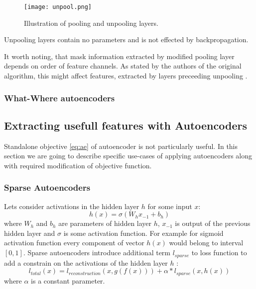 \begin{figure}[h!]
  \centering
    \texttt{[image: unpool.png]}
  \caption{Illustration of pooling and unpooling layers.}
  \label{fig:unpool}
\end{figure}

Unpooling layers contain no parameters and is not effected by backpropagation.

It worth noting, that mask information extracted by modified pooling layer depends on order of feature channels. As stated by the authors of the original algorithm, this might affect features, extracted by layers preceeding unpooling \cite{Zhao2015}.

\subsubsection{What-Where autoencoders}



\subsection{Extracting usefull features with Autoencoders}\label{ch:sae}

Standalone objective \ref{eq:ae} of autoencoder is not particularly useful.
In this section we are going to describe specific use-cases of applying autoencoders along with required modification of objective function.

\subsubsection{Sparse Autoencoders}\label{ch:vae}

Lets consider activations in the hidden layer $h$ for some input $x$:
\begin{equation}
  h(x) = \sigma(W_{h}x_{-1} + b_{h})
\end{equation}
where $W_h$ and $b_h$ are parameters of hidden layer $h$, $x_{-1}$ is output of the previous hidden layer and $\sigma$ is some activation function.
For example for sigmoid activation function every component of vector $h(x)$ would belong to interval $[0, 1]$.
Sparse autoencoders introduce additional term $l_{sparse}$ to loss function to add a constrain on the activations of the hidden layer $h$ \cite{Ng2011}:
\begin{equation}
  l_{total}(x) = l_{reconstruction}(x, g(f(x))) + \alpha*l_{sparse}(x, h(x))
\end{equation}
where $\alpha$ is a constant parameter.

